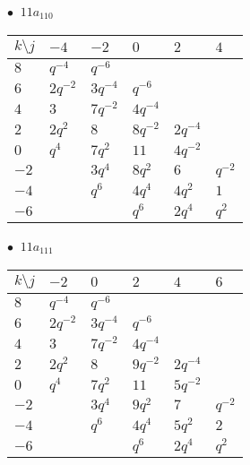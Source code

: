 \begin{minipage}{\linewidth}
$\bullet\ $ $11a_{110}$ \vspace{0.5em} \\
\begin{tabular}{l|lllll}
$k \setminus j$ & $-4$ & $-2$ & $0$ & $2$ & $4$ \\
\hline
$8$ & $q^{-4}$ & $q^{-6}$ &  &  &  \\
$6$ & $2q^{-2}$ & $3q^{-4}$ & $q^{-6}$ &  &  \\
$4$ & $3$ & $7q^{-2}$ & $4q^{-4}$ &  &  \\
$2$ & $2q^{2}$ & $8$ & $8q^{-2}$ & $2q^{-4}$ &  \\
$0$ & $q^{4}$ & $7q^{2}$ & $11$ & $4q^{-2}$ &  \\
$-2$ &  & $3q^{4}$ & $8q^{2}$ & $6$ & $q^{-2}$ \\
$-4$ &  & $q^{6}$ & $4q^{4}$ & $4q^{2}$ & $1$ \\
$-6$ &  &  & $q^{6}$ & $2q^{4}$ & $q^{2}$ \\
\end{tabular}
\vspace{2em}
\end{minipage}
%
\begin{minipage}{\linewidth}
$\bullet\ $ $11a_{111}$ \vspace{0.5em} \\
\begin{tabular}{l|lllll}
$k \setminus j$ & $-2$ & $0$ & $2$ & $4$ & $6$ \\
\hline
$8$ & $q^{-4}$ & $q^{-6}$ &  &  &  \\
$6$ & $2q^{-2}$ & $3q^{-4}$ & $q^{-6}$ &  &  \\
$4$ & $3$ & $7q^{-2}$ & $4q^{-4}$ &  &  \\
$2$ & $2q^{2}$ & $8$ & $9q^{-2}$ & $2q^{-4}$ &  \\
$0$ & $q^{4}$ & $7q^{2}$ & $11$ & $5q^{-2}$ &  \\
$-2$ &  & $3q^{4}$ & $9q^{2}$ & $7$ & $q^{-2}$ \\
$-4$ &  & $q^{6}$ & $4q^{4}$ & $5q^{2}$ & $2$ \\
$-6$ &  &  & $q^{6}$ & $2q^{4}$ & $q^{2}$ \\
\end{tabular}
\vspace{2em}
\end{minipage}
%
